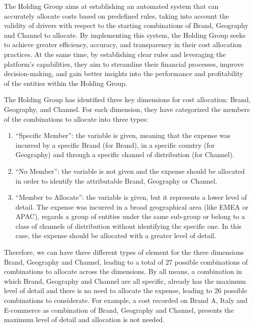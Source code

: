 \documentclass[12pt,a4paper,openright,twoside]{book}
\begin{document}
The Holding Group aims at establishing an automated system that can accurately allocate costs based on predefined rules, taking into account the validity of drivers with respect to the starting combinations of Brand, Geography and Channel to allocate.
%
By implementing this system, the Holding Group seeks to achieve greater efficiency, accuracy, and transparency in their cost allocation practices.
%
At the same time,  by establishing clear rules and leveraging the platform's capabilities, they aim to streamline their financial processes, improve decision-making, and gain better insights into the performance and profitability of the entities within the Holding Group.

The Holding Group has identified three key dimensions for cost allocation: Brand, Geography, and Channel. 
%
For each dimension, they have categorized the members of the combinations to allocate into three types: 

\begin{enumerate}
    \item ``Specific Member'': the variable is given, meaning that the expense was incurred by a specific Brand (for Brand), in a specific country (for Geography) and through a specific channel of distribution (for Channel).
    \item ``No Member'': the variable is not given and the expense should be allocated in order to identify the attributable Brand, Geography or Channel.
    \item ``Member to Allocate'': the variable is given, but it represents a lower level of detail. The expense was incurred in a broad geographical area (like EMEA or APAC), regards a group of entities under the same sub-group or belong to a class of channels of distribution without identifying the specific one. In this case, the expense should be allocated with a greater level of detail.
\end{enumerate}

Therefore, we can have three different types of element for the three dimensions Brand, Geography and Channel, leading to a total of 27 possible combinations of combinations to allocate across the dimensions.
%
By all means, a combination in which Brand, Geography and Channel are all specific, already has the maximum level of detail and there is no need to allocate the expense, leading to 26 possible combinations to considerate.
%
For example, a cost recorded on Brand A, Italy and E-commerce as combination of Brand, Geography and Channel, presents the maximum level of detail and allocation is not needed.
\end{document}
